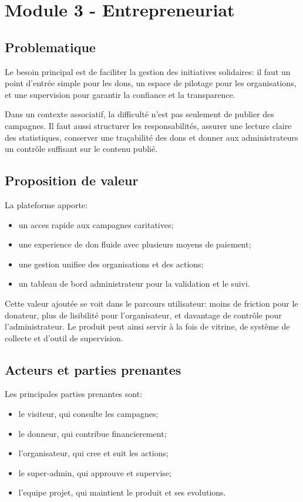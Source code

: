 \documentclass[12pt,a4paper]{report}
\begin{document}
\chapter{Module 3 - Entrepreneuriat}

\section{Problematique}
Le besoin principal est de faciliter la gestion des initiatives solidaires: il faut un point d'entrée simple pour les dons, un espace de pilotage pour les organisations, et une supervision pour garantir la confiance et la transparence.

Dans un contexte associatif, la difficulté n'est pas seulement de publier des campagnes. Il faut aussi structurer les responsabilités, assurer une lecture claire des statistiques, conserver une traçabilité des dons et donner aux administrateurs un contrôle suffisant sur le contenu publié.

\section{Proposition de valeur}
La plateforme apporte:
\begin{itemize}[leftmargin=1.2cm]
  \item un acces rapide aux campagnes caritatives;
  \item une experience de don fluide avec plusieurs moyens de paiement;
  \item une gestion unifiee des organisations et des actions;
  \item un tableau de bord administrateur pour la validation et le suivi.
\end{itemize}

Cette valeur ajoutée se voit dans le parcours utilisateur: moins de friction pour le donateur, plus de lisibilité pour l'organisateur, et davantage de contrôle pour l'administrateur. Le produit peut ainsi servir à la fois de vitrine, de système de collecte et d'outil de supervision.

\section{Acteurs et parties prenantes}
Les principales parties prenantes sont:
\begin{itemize}[leftmargin=1.2cm]
  \item le visiteur, qui consulte les campagnes;
  \item le donneur, qui contribue financierement;
  \item l'organisateur, qui cree et suit les actions;
  \item le super-admin, qui approuve et supervise;
  \item l'equipe projet, qui maintient le produit et ses evolutions.
\end{itemize}
\end{document}

